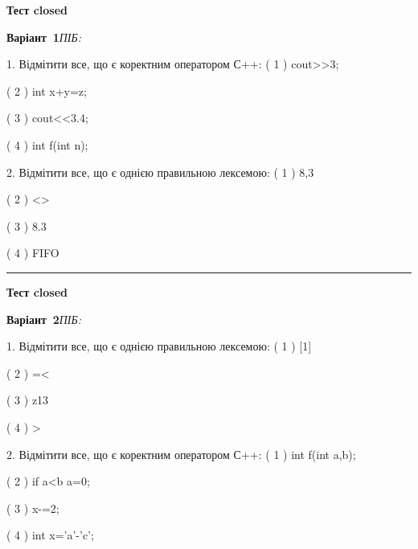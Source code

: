 \documentclass[11pt]{article}
\begin{document}
{\large\textbf{Тест closed}}

\textbf{Варіант \No\,1}\hfill \textit{ПІБ:}\,\underline{\hspace{60mm}}
\vspace{4mm}

1. Відмітити все, що є коректним оператором С++:
( 1 ) cout>>3;

( 2 ) int x+y=z;

( 3 ) cout<<3.4;

( 4 ) int f(int n);

2. Відмітити все, що є однією правильною лексемою:
( 1 ) 8,3

( 2 ) <>

( 3 ) 8.3

( 4 ) FIFO



\vspace{10mm}
\noindent\rule{\textwidth}{0.3pt}
\vspace{8mm}
{\large\textbf{Тест closed}}

\textbf{Варіант \No\,2}\hfill \textit{ПІБ:}\,\underline{\hspace{60mm}}
\vspace{4mm}

1. Відмітити все, що є однією правильною лексемою:
( 1 ) [1]

( 2 ) =<

( 3 ) z13

( 4 ) >

2. Відмітити все, що є коректним оператором С++:
( 1 ) int f(int a,b);

( 2 ) if a<b a=0;

( 3 ) x-=2;

( 4 ) int x='a'-'c';



\newpage
\end{document}
